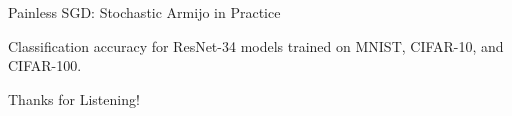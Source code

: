 \documentclass[notheorems]{beamer}
\begin{document}
    \begin{frame}{Painless SGD: Stochastic Armijo in Practice}

        {\large Classification accuracy for ResNet-34 models trained on MNIST, CIFAR-10, and CIFAR-100. }\vspace{0.5em}

        \begin{figure}
            \centering
            \vspace{0.5em}
        \end{figure}

    \end{frame}


    \begin{frame}{}
        \begin{center}
        \huge Thanks for Listening!
        \end{center}
    \end{frame}
\end{document}
